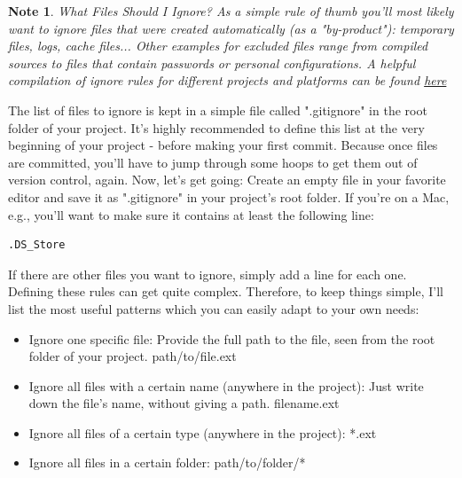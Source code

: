 \documentclass{article}
\begin{document}
 \newtheorem*{note}{Note}
 \begin{note}
What Files Should I Ignore?
\newline\newline
As a simple rule of thumb you'll most likely want to ignore files that were created automatically (as a "by-product"): temporary files, logs, cache files...
\newline\newline
Other examples for excluded files range from compiled sources to files that contain passwords or personal configurations.
\newline\newline
A helpful compilation of ignore rules for different projects and platforms can be found \href{https://www.github.com/github/gitignore}{here} 
 \end{note}

The list of files to ignore is kept in a simple file called ".gitignore" in the root folder of your project. It's highly recommended to define this list at the very beginning of your project - before making your first commit. Because once files are committed, you'll have to jump through some hoops to get them out of version control, again.
\newline\newline
Now, let's get going: Create an empty file in your favorite editor and save it as ".gitignore" in your project's root folder. If you're on a Mac, e.g., you'll want to make sure it contains at least the following line:
\newline
\begin{lstlisting}[language=bash]
.DS_Store
\end{lstlisting}

If there are other files you want to ignore, simply add a line for each one. Defining these rules can get quite complex. Therefore, to keep things simple, I'll list the most useful patterns which you can easily adapt to your own needs:
\begin{itemize}
    \item Ignore one specific file: Provide the full path to the file, seen from the root folder of your project.
    \newline
path/to/file.ext
    \item Ignore all files with a certain name (anywhere in the project): Just write down the file's name, without giving a path.
    \newline
filename.ext
    \item Ignore all files of a certain type (anywhere in the project): 
    \newline
    *.ext
    \item  Ignore all files in a certain folder:
    \newline
path/to/folder/*
\end{itemize}
\end{document}
